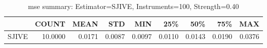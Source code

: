 \begin{table}[ht]
\centering
\caption{mse summary: Estimator=SJIVE, Instruments=100, Strength=0.40}
\begin{tabular}{lrrrrrrrr}
\toprule
 & COUNT & MEAN & STD & MIN & 25\% & 50\% & 75\% & MAX \\
\midrule
SJIVE & 10.0000 & 0.0171 & 0.0087 & 0.0097 & 0.0110 & 0.0143 & 0.0190 & 0.0376 \\
\bottomrule
\end{tabular}
\end{table}
